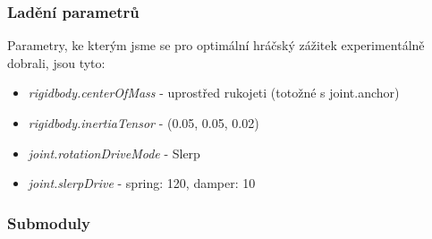 \subsubsection*{Ladění parametrů}

Parametry, ke kterým jsme se pro optimální hráčský zážitek experimentálně dobrali, jsou tyto: 
\begin{itemize}
  \item \textit{rigidbody.centerOfMass} - uprostřed rukojeti (totožné s joint.anchor)
  \item \textit{rigidbody.inertiaTensor} - (0.05, 0.05, 0.02)
  \item \textit{joint.rotationDriveMode} - Slerp
  \item \textit{joint.slerpDrive} - spring: 120, damper: 10
\end{itemize}


\subsubsection*{Submoduly}


